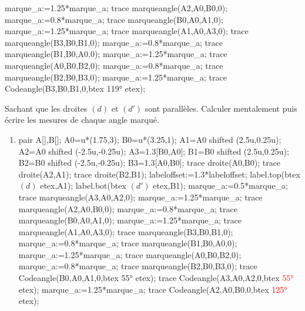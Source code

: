 \begin{exercice*}
\begin{enumerate}
\begin{Geometrie}[CoinHD={(7u,4u)}]
            marque_a:=1.25*marque_a;
            trace marqueangle(A2,A0,B0,0);
            marque_a:=0.8*marque_a;
            trace marqueangle(B0,A0,A1,0);
            marque_a:=1.25*marque_a;
            trace marqueangle(A1,A0,A3,0);
            trace marqueangle(B3,B0,B1,0);
            marque_a:=0.8*marque_a;
            trace marqueangle(B1,B0,A0,0);
            marque_a:=1.25*marque_a;
            trace marqueangle(A0,B0,B2,0);
            marque_a:=0.8*marque_a;
            trace marqueangle(B2,B0,B3,0);
            marque_a:=1.25*marque_a;
            trace Codeangle(B3,B0,B1,0,btex \ang{119} etex);         
         \end{Geometrie}
   \end{enumerate}
\end{exercice*} 
\begin{corrige}
   Sachant que les droites $(d)$ et $(d')$ sont parallèles. Calculer mentalement puis écrire les mesures de chaque angle marqué.
   \par
   \begin{enumerate}
     \item \phantom{rrr}\par
     \begin{Geometrie}[CoinHD={(6u,4u)}]
         pair A[],B[];
         A0=u*(1.75,3);
         B0=u*(3.25,1);
         A1=A0 shifted (2.5u,0.25u);
         A2=A0 shifted (-2.5u,-0.25u);
         A3=1.3[B0,A0];
         B1=B0 shifted (2.5u,0.25u);
         B2=B0 shifted (-2.5u,-0.25u);
         B3=1.3[A0,B0];
         trace droite(A0,B0);
         trace droite(A2,A1);
         trace droite(B2,B1);
         labeloffset:=1.3*labeloffset;
         label.top(btex $(d)$ etex,A1);
         label.bot(btex $(d')$ etex,B1);         
         marque_a:=0.5*marque_a;
         trace marqueangle(A3,A0,A2,0);
         marque_a:=1.25*marque_a;
         trace marqueangle(A2,A0,B0,0);
         marque_a:=0.8*marque_a;
         trace marqueangle(B0,A0,A1,0);
         marque_a:=1.25*marque_a;
         trace marqueangle(A1,A0,A3,0);
         trace marqueangle(B3,B0,B1,0);
         marque_a:=0.8*marque_a;
         trace marqueangle(B1,B0,A0,0);
         marque_a:=1.25*marque_a;
         trace marqueangle(A0,B0,B2,0);
         marque_a:=0.8*marque_a;
         trace marqueangle(B2,B0,B3,0);
         trace Codeangle(B0,A0,A1,0,btex \ang{55} etex);
         trace Codeangle(A3,A0,A2,0,btex \textcolor{red}{\ang{55}} etex);
         marque_a:=1.25*marque_a;
         trace Codeangle(A2,A0,B0,0,btex \textcolor{red}{\ang{125}} etex);

\end{Geometrie}
\end{enumerate}
\end{corrige}
